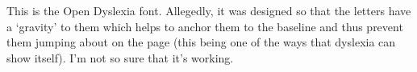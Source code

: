 \documentclass{article}
\begin{document}
This is the Open Dyslexia font.
Allegedly, it was designed so that the letters have a `gravity' to
them which helps to anchor them to the baseline and thus prevent them
jumping about on the page (this being one of the ways that dyslexia
can show itself).
I'm not so sure that it's working.
\end{document}
